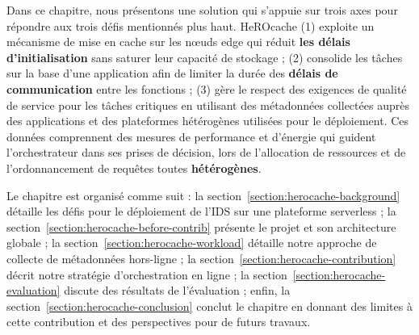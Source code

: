 Dans ce chapitre, nous présentons une solution qui s'appuie sur trois axes pour répondre aux trois défis mentionnés plus haut. HeROcache (1) exploite un mécanisme de mise en cache sur les nœuds edge qui réduit \textbf{les délais d'initialisation} sans saturer leur capacité de stockage ; (2) consolide les tâches sur la base d'une application afin de limiter la durée des \textbf{délais de communication} entre les fonctions ; (3) gère le respect des exigences de qualité de service pour les tâches critiques en utilisant des métadonnées collectées auprès des applications et des plateformes hétérogènes utilisées pour le déploiement. Ces données comprennent des mesures de performance et d'énergie qui guident l'orchestrateur dans ses prises de décision, lors de l'allocation de ressources et de l'ordonnancement de requêtes toutes \textbf{hétérogènes}.


Le chapitre est organisé comme suit : la section~\ref{section:herocache-background} détaille les défis pour le déploiement de l'IDS sur une plateforme serverless ; la section~\ref{section:herocache-before-contrib} présente le projet et son architecture globale ; la section~\ref{section:herocache-workload} détaille notre approche de collecte de métadonnées hors-ligne ; la section~\ref{section:herocache-contribution} décrit notre stratégie d'orchestration en ligne ; la section~\ref{section:herocache-evaluation} discute des résultats de l'évaluation ; enfin, la section~\ref{section:herocache-conclusion} conclut le chapitre en donnant des limites à cette contribution et des perspectives pour de futurs travaux.

